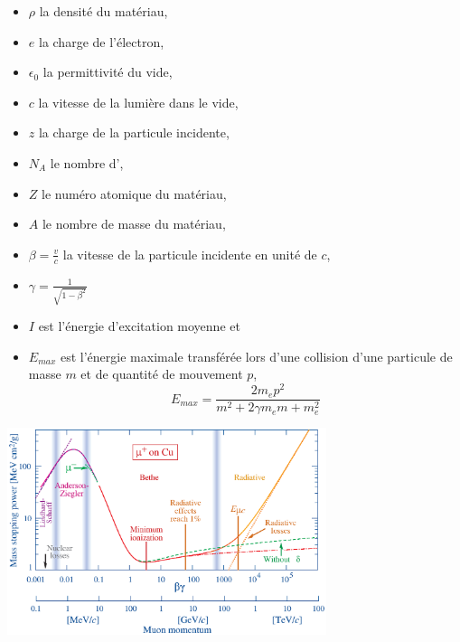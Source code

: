 \begin{itemize}[label=$\bullet$]
	\item $\rho$ la densité du matériau,
	\item $e$ la charge de l'électron,
	\item $\epsilon_{0}$ la permittivité du vide,
	\item $c$ la vitesse de la lumière dans le vide,
	\item $z$ la charge de la particule incidente,
	\item $N_{A}$ le nombre d',
	\item $Z$ le numéro atomique du matériau,
	\item $A$ le nombre de masse du matériau,
	\item $\beta=\frac{v}{c}$ la vitesse de la particule incidente en unité de $c$,
	\item $\gamma=\frac{1}{\sqrt{1-\beta^{2}}}$
	\item $I$ est l'énergie d'excitation moyenne et
	\item $E_{max}$ est l'énergie maximale transférée lors d'une collision d'une particule de masse $m$ et de quantité de mouvement $p$,
	\begin{equation}
	E_{max}=\frac{2m_{e}p^{2}}{m^2+2\gamma m_{e}m+m_{e}^2}
	\end{equation}
\end{itemize}

\begin{minipagewithmarginpars}[h]{0.95\textwidth}
	\centering
	\includegraphics[width=0.70\textwidth]{RPC/Bethe-Bloch.eps}
	\label{Bethe-Block}
\end{minipagewithmarginpars}

